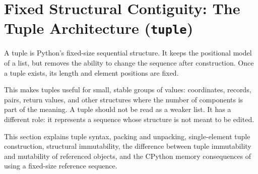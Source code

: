 \section{Fixed Structural Contiguity: The Tuple Architecture (\texttt{tuple})}

A tuple is Python's fixed-size sequential structure. It keeps the positional model of a list, but removes the ability to change the sequence after construction. Once a tuple exists, its length and element positions are fixed.

This makes tuples useful for small, stable groups of values: coordinates, records, pairs, return values, and other structures where the number of components is part of the meaning. A tuple should not be read as a weaker list. It has a different role: it represents a sequence whose structure is not meant to be edited.

This section explains tuple syntax, packing and unpacking, single-element tuple construction, structural immutability, the difference between tuple immutability and mutability of referenced objects, and the CPython memory consequences of using a fixed-size reference sequence.